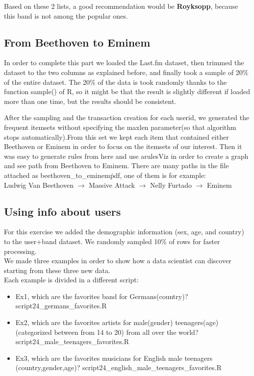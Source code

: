 \documentclass[a4paper]{article}
\begin{document}
	\par\noindent Based on these 2 lists, a good recommendation would be \textbf{Royksopp}, because this band is not among the popular ones.
	
	\subsection{From Beethoven to Eminem}
	In order to complete this part we loaded the Last.fm dataset, then trimmed the dataset to the two columns as explained before, and finally took a sample of 20\% of the entire dataset. The 20\% of the data is took randomly thanks to the function sample() of R, so it might be that the result is slightly different if loaded more than one time, but the results should be consistent.
	
	After the sampling and the transaction creation for each userid, we generated the frequent itemsets without specifying the maxlen parameter(so that algorithm stops automatically).From this set we kept each item that contained either Beethoven or Eminem in order to focus on the itemsets of our interest. 
	Then it was easy to generate rules from here and use arulesViz in order to create a graph and see path from Beethoven to Eminem.
	There are many paths in the file attached as beethoven\_to\_eminem\.pdf, one of them is for example:\\
	Ludwig Van Beethoven $\rightarrow$ Massive Attack $\rightarrow$ Nelly Furtado $\rightarrow$ Eminem
	
	
	\subsection{Using info about users}
	For this exercise we added the demographic information (sex, age, and country) to the user+band dataset. We randomly sampled 10\% of rows for faster processing.\\
	We made three examples in order to show how a data scientist can discover starting from these three new data.\\
	Each example is divided in a different script:
	
	\begin{itemize}
		\item Ex1, which are the favorites band for Germans(country)? script24\_germans\_favorites.R 
		\item Ex2, which are the favorites artists for male(gender) teenagers(age) (categorized between from 14 to 20) from all over the world? script24\_male\_teenagers\_favorites.R
		\item Ex3, which are the favorites musicians for English male teenagers (country,gender,age)? script24\_english\_male\_teenagers\_favorites.R
	\end{itemize}
	
\end{document}
